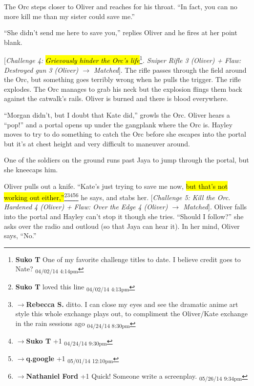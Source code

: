 The Orc steps closer to Oliver and reaches for his throat.  ``In fact, you can no more kill me than my sister could save me.''



``She didn't send me here to save you,'' replies Oliver and he fires at her point blank.



{[}\textit{Challenge 4: }\textit{\hl{Grievously hinder the Orc's life}}\footnote{\textbf{Suko T }One of my favorite challenge titles to date.  I believe credit goes to Nate? \textsubscript{04/02/14 4:14pm}}\textit{.  Sniper Rifle 3 (Oliver) + }\textit{ {\color[RGB]{255,0,0}Flaw: Destroyed gun 3 (Oliver) } }\textit{$\rightarrow$ Matched}{]}.  The rifle passes through the field around the Orc, but something goes terribly wrong when he pulls the trigger.  The rifle explodes.  The Orc manages to grab his neck but the explosion flings them back against the catwalk's rails.  Oliver is burned and there is blood everywhere.



``Morgan didn't, but I doubt that Kate did,'' growls the Orc.  Oliver hears a ``pop!'' and a portal opens up under the gangplank where the Orc is.  Hayley moves to try to do something to catch the Orc before she escapes into the portal but it's at chest height and very difficult to maneuver around.



One of the soldiers on the ground runs past Jaya to jump through the portal, but she kneecaps him. 



Oliver pulls out a knife.  ``Kate's just trying to save me now, \hl{but that's not working out either,''}\footnote{\textbf{Suko T }loved this line \textsubscript{04/02/14 4:13pm}}\footnote{$\rightarrow$\textbf{Rebecca S. }ditto.  I can close my eyes and see the dramatic anime art style this whole exchange plays out, to compliment the Oliver/Kate exchange in the rain sessions ago \textsubscript{04/24/14 8:30pm}}\footnote{$\rightarrow$\textbf{Suko T }+1 \textsubscript{04/24/14 9:30pm}}\footnote{$\rightarrow$\textbf{q.google }+1 \textsubscript{05/01/14 12:10pm}}\footnote{$\rightarrow$\textbf{Nathaniel Ford }+1 Quick! Someone write a screenplay. \textsubscript{05/26/14 9:34pm}} he says, and stabs her.  {[}\textit{Challenge 5: Kill the Orc.  Hardened 4 (Oliver) + }\textit{ {\color[RGB]{255,0,0}Flaw: Over the Edge 4 (Oliver) } }\textit{$\rightarrow$ Matched}{]}.  Oliver falls into the portal and Hayley can't stop it though she tries.  ``Should I follow?'' she asks over the radio and outloud (so that Jaya can hear it).  In her mind, Oliver says, ``No.''



